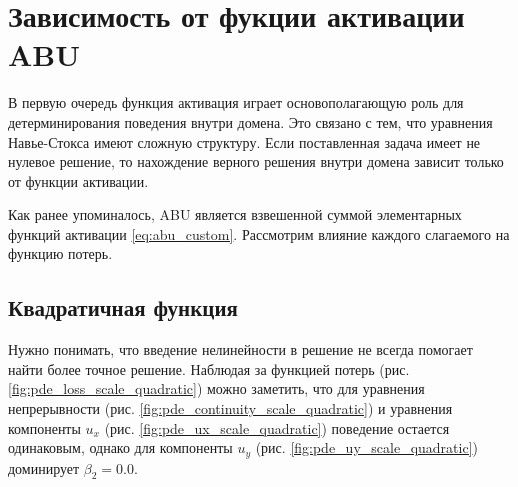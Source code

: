 \section{Зависимость от фукции активации ABU}

В первую очередь функция активация играет основополагающую роль для
детерминирования поведения внутри домена. Это связано с тем, что
уравнения Навье-Стокса имеют сложную структуру. Если поставленная
задача имеет не нулевое решение, то нахождение верного решения внутри
домена зависит только от функции активации.

Как ранее упоминалось, ABU является взвешенной суммой элементарных функций
активации \eqref{eq:abu_custom}. Рассмотрим влияние каждого слагаемого на
функцию потерь.
\subsection{Квадратичная функция}
Нужно понимать, что введение нелинейности в решение не всегда помогает
найти более точное решение. Наблюдая за функцией потерь
(рис. \ref{fig:pde_loss_scale_quadratic}) можно заметить, что для уравнения
непрерывности (рис. \ref{fig:pde_continuity_scale_quadratic}) и уравнения
компоненты $u_x$ (рис. \ref{fig:pde_ux_scale_quadratic}) поведение 
остается одинаковым, однако для компоненты $u_y$ (рис. \ref{fig:pde_uy_scale_quadratic})
доминирует $\beta_2 = 0.0$.


